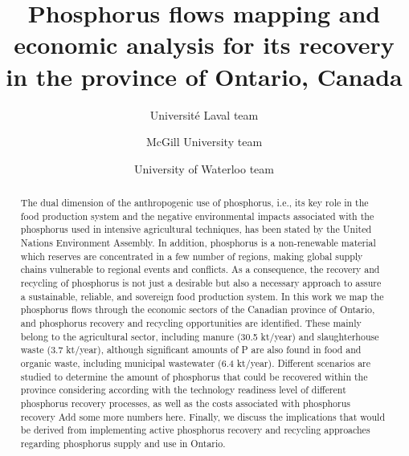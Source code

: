 \documentclass[authoryear]{elsarticle}
\begin{document}
\begin{frontmatter}
	\title{
Phosphorus flows mapping and economic analysis for its recovery in the province of Ontario, Canada
	}
	
	\author[ULaval]{Université Laval team}
	\author[McGill]{McGill University team}
	\author[Waterloo]{University of Waterloo team}
		
	\address[ULaval]{Université Laval}
	\address[McGill]{McGill University}
	\address[Waterloo]{University of Waterloo}
	
	\begin{abstract}
		The dual dimension of the anthropogenic use of phosphorus, i.e., its key role in the food production system and the negative environmental impacts associated with the phosphorus used in intensive agricultural techniques, has been stated by the United Nations Environment Assembly. In addition, phosphorus is a non-renewable material which reserves are concentrated in a few number of regions, making global supply chains vulnerable to regional events and conflicts. As a consequence, the recovery and recycling of phosphorus is not just a desirable but also a necessary approach to assure a sustainable, reliable, and sovereign food production system. In this work we map the phosphorus flows through the economic sectors of the Canadian province of Ontario, and phosphorus recovery and recycling opportunities are identified. These mainly belong to the agricultural sector, including manure (30.5 kt/year) and slaughterhouse waste (3.7 kt/year), although significant amounts of P are also found in food and organic waste, including municipal wastewater (6.4 kt/year). Different scenarios are studied to determine the amount of phosphorus that could be recovered within the province considering according with the technology readiness level of different phosphorus recovery processes, as well as the costs associated with phosphorus recovery {\color{red}Add some more numbers here}. Finally, we discuss the implications that would be derived from implementing active phosphorus recovery and recycling approaches regarding phosphorus supply and use in Ontario. 
	\end{abstract}
%	
\end{frontmatter}
\end{document}
